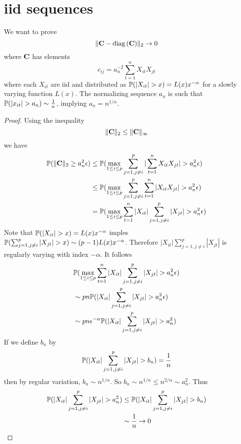 \documentclass{article}
\begin{document}
\section{iid sequences}
We want to prove
\[
\|\mathbf{C} - \text{diag\,}(\mathbf{C})\|_2 \to 0
\]
where $\mathbf{C}$ has elements
\[
c_{ij} = a_n^{-2} \sum_{t=1}^n X_{it} X_{jt}
\]
where each $X_{it}$ are iid and distributed as $\mathbb{P}(|X_{it}| > x) = L(x)
x^{-\alpha}$ for a slowly varying function $L(x)$. The normalizing
sequence $a_n$ is such that $\mathbb{P}(|x_{it}| > a_n) \sim {1 \over n}$,
implying $a_n = n^{1/\alpha}$.
\begin{proof}
  Using the inequality
  \[
  \|\mathbf{C}\|_2 \leq \|\mathbf{C}\|_\infty
  \]
  we have
  \begin{align*}
  \mathbb{P}(\|\mathbf{C}\|_2 \geq a_n^2 \epsilon) & \leq
  \mathbb{P}(\max_{1\leq i \leq p} \sum_{j=1, j\neq i}^p |\sum_{t=1}^n
  X_{it} X_{jt}| > a_n^2 \epsilon) \\
  &\leq \mathbb{P}(\max_{1\leq i \leq p} \sum_{j=1, j\neq i}^p \sum_{t=1}^n
  |X_{it} X_{jt}| > a_n^2 \epsilon) \\
  &= \mathbb{P}(\max_{1\leq i \leq p} \sum_{t=1}^n |X_{it}| \sum_{j=1, j\neq i}^p
  |X_{jt}| > a_n^2 \epsilon) \\
  \end{align*}
  Note that $\mathbb{P}(|X_{it}| > x) = L(x) x^{-\alpha}$ imples $\mathbb{P}(\sum_{j=1,
    j\neq i}^p |X_{jt}| > x) \sim (p-1)L(x) x^{-\alpha}$. Therefore
  $|X_{it}| \sum_{j=1, j\neq i}^p |X_{jt}|$ is regularly varying with
  index $-\alpha$. It follows
  \begin{align*}
    & \mathbb{P}(\max_{1\leq i \leq p} \sum_{t=1}^n |X_{it}| \sum_{j=1, j\neq i}^p
    |X_{jt}| > a_n^2 \epsilon) \\
    &\sim p n \mathbb{P}(|X_{it}| \sum_{j=1, j\neq i}^p |X_{jt}| > a_n^2
    \epsilon) \\
    &\sim p n \epsilon^{-\alpha} \mathbb{P}(|X_{it}| \sum_{j=1, j\neq i}^p |X_{jt}| > a_n^2)
  \end{align*}
  If we define $b_n$ by
  \[
  \mathbb{P}(|X_{it}| \sum_{j=1, j\neq i}^p |X_{jt}| > b_n) = {1 \over n}
  \]
  then by regular variation, $b_n \sim n^{1/\alpha}$. So $b_n \sim
  n^{1/\alpha} \leq n^{2/\alpha} \sim a_n^2$. Thus
  \begin{align*}
    \mathbb{P}(|X_{it}| \sum_{j=1, j\neq i}^p |X_{jt}| > a_n^2) &\leq
    \mathbb{P}(|X_{it}| \sum_{j=1, j\neq i}^p |X_{jt}| > b_n) \\
    &\sim {1 \over n} \to 0
  \end{align*}
  
\end{proof}
\end{document}
